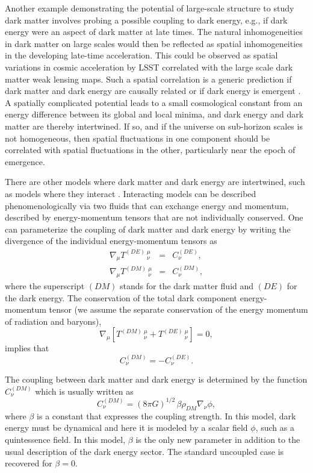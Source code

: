 Another example demonstrating the potential of large-scale structure to study dark matter involves probing a possible coupling to dark energy, e.g., if dark energy were an aspect of dark matter at late times.
The natural inhomogeneities in dark matter on large scales would then be reflected as spatial inhomogeneities in the developing late-time acceleration. 
This could be observed as spatial variations in cosmic acceleration by LSST correlated with the large scale dark matter weak lensing maps. 
Such a spatial correlation is a generic prediction if dark matter and dark energy are causally related or if dark energy is emergent \citep{1801.09658}. 
A spatially complicated potential leads to a small cosmological constant from an energy difference between its global and local minima, and dark energy and dark matter are thereby intertwined. 
If so, and if the universe on sub-horizon scales is not homogeneous, then spatial fluctuations in one component should be correlated with spatial fluctuations in the other, particularly near the epoch of emergence.

There are other models where dark matter and dark energy are intertwined, such as models where they interact 
\citep{Amendola:1999er,Holden:1999hm}.
Interacting models can be described phenomenologically via two fluids that can exchange energy and momentum, 
described by energy-momentum tensors that are not individually conserved. One can parameterize the coupling of
dark matter and dark energy by writing the divergence of the individual energy-momentum tensors as 
\begin{eqnarray}
\nabla_{\mu} T^{(DE)}\,^{\mu}_{\nu} &=& C^{(DE)}_{\nu}, \label{cons_phi} \\
\nabla_{\mu} T^{(DM)}\,^{\mu}_{\nu} &=& C^{(DM)}_{\nu}, \label{cons_dm}
\end{eqnarray}
where the superscript $(DM)$ stands for the dark matter fluid and $(DE)$ for the dark energy.
The conservation of the total dark component energy-momentum tensor 
(we assume the separate conservation of the energy momentum of radiation and baryons),
\begin{equation}
\label{energyconservation}
\nabla_{\mu} \left[ T^{(DM)} \,^{\mu}_{\nu} + T^{(DE)} \,^{\mu}_{\nu} \right]= 0,
\end{equation}
implies that
\begin{equation}
C^{(DM)}_{\nu}=-C^{(DE)}_{\nu}.
\end{equation}

The coupling between dark matter and dark energy is determined by the function $C^{(DM)}_{\nu}$ which is usually
written as
\begin{equation}
C^{(DM)}_{\nu} = (8\pi G)^{1/2} \,\beta\rho_{DM}\nabla_{\nu} \phi,
\end{equation}
where $\beta$ is a constant that expresses the coupling strength. In this model, dark energy must be dynamical and here it is modeled by a scalar field  $\phi$, such as a quintessence field.
In this model, $\beta$ is the only new parameter in addition to the usual description of the dark energy sector.
The standard uncoupled case is recovered for $\beta=0$.


